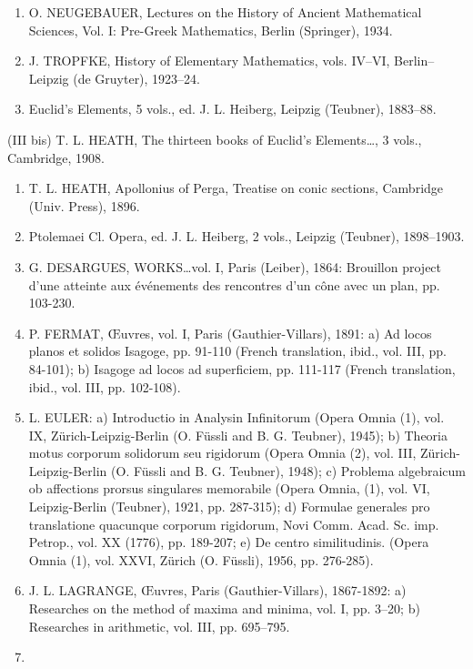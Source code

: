 \begin{enumerate}
\def\labelenumi{(\Roman{enumi})}
\item
  O. NEUGEBAUER, Lectures on the History of Ancient Mathematical Sciences, Vol. I: Pre-Greek Mathematics, Berlin (Springer), 1934.
\item
  J. TROPFKE, History of Elementary Mathematics, vols. IV–VI, Berlin–Leipzig (de Gruyter), 1923–24.
\item
  Euclid's Elements, 5 vols., ed. J. L. Heiberg, Leipzig (Teubner), 1883–88.
\end{enumerate}

(III bis) T. L. HEATH, The thirteen books of Euclid's Elements\ldots, 3 vols., Cambridge, 1908.

\begin{enumerate}
\def\labelenumi{(\Roman{enumi})}
\setcounter{enumi}{3}
\item
  T. L. HEATH, Apollonius of Perga, Treatise on conic sections, Cambridge (Univ. Press), 1896.
\item
  Ptolemaei Cl. Opera, ed. J. L. Heiberg, 2 vols., Leipzig (Teubner), 1898–1903.
\item
  G. DESARGUES, WORKS\ldots vol. I, Paris (Leiber), 1864: Brouillon project d'une atteinte aux événements des rencontres d'un cône avec un plan, pp. 103-230.
\item
  P. FERMAT, Œuvres, vol. I, Paris (Gauthier-Villars), 1891: a) Ad locos planos et solidos Isagoge, pp. 91-110 (French translation, ibid., vol. III, pp. 84-101); b) Isagoge ad locos ad superficiem, pp. 111-117 (French translation, ibid., vol. III, pp. 102-108).
\item
  L. EULER: a) Introductio in Analysin Infinitorum (Opera Omnia (1), vol. IX, Zürich-Leipzig-Berlin (O. Füssli and B. G. Teubner), 1945); b) Theoria motus corporum solidorum seu rigidorum (Opera Omnia (2), vol. III, Zürich-Leipzig-Berlin (O. Füssli and B. G. Teubner), 1948); c) Problema algebraicum ob affections prorsus singulares memorabile (Opera Omnia, (1), vol. VI, Leipzig-Berlin (Teubner), 1921, pp. 287-315); d) Formulae generales pro translatione quacunque corporum rigidorum, Novi Comm. Acad. Sc. imp. Petrop., vol. XX (1776), pp. 189-207; e) De centro similitudinis. (Opera Omnia (1), vol. XXVI, Zürich (O. Füssli), 1956, pp. 276-285).
\item
  J. L. LAGRANGE, Œuvres, Paris (Gauthier-Villars), 1867-1892: a) Researches on the method of maxima and minima, vol. I, pp. 3–20; b) Researches in arithmetic, vol. III, pp. 695–795.
\item

\end{enumerate}
